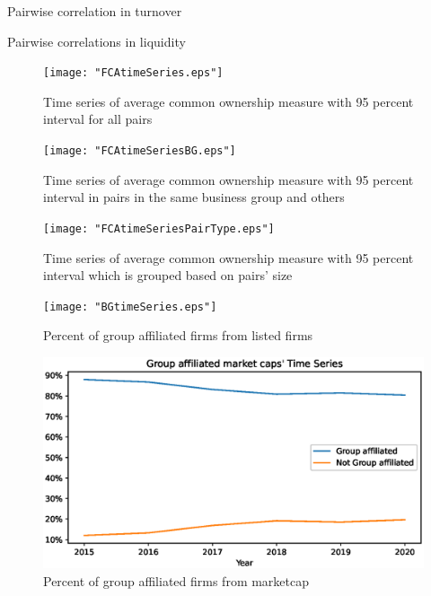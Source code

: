 \documentclass[12pt, a4paper]{article}
\begin{document}
\begin{table}[htbp]
	\centering
	\caption{Pairwise correlation in turnover  }
	\resizebox{0.7\textheight}{!}{
		\centering
		
	}
	\label{mresult2-turnover}
\end{table}

\begin{table}[htbp]
	\centering
	\caption{Pairwise correlations in liquidity}
	\resizebox{0.7\textheight}{!}{
		\centering
		
	}
	\label{mresult2-liquidity}
	\end{table}



\newpage
		\begin{figure}
	\centering  
	\caption{Time series of average common ownership measure with 95 percent interval for all pairs}
	\texttt{[image: "FCAtimeSeries.eps"]}
	
\end{figure} 

			\begin{figure}
	\centering  
	\caption{Time series of average common ownership measure with 95 percent interval in pairs in the same business group and others}
	\texttt{[image: "FCAtimeSeriesBG.eps"]}
\end{figure}    

\begin{figure}
	\centering  
	\caption{Time series of average common ownership measure with 95 percent interval which is grouped based on pairs' size}
	\texttt{[image: "FCAtimeSeriesPairType.eps"]}
\end{figure}




	\begin{figure}
	\centering  
	\caption{Percent of group affiliated firms from listed firms}
	\texttt{[image: "BGtimeSeries.eps"]}
	
\end{figure}  

\begin{figure}
	\centering  
	\caption{Percent of group affiliated firms from marketcap}
	\includegraphics[width=\linewidth]{"BGMarketCaptimeSeries.eps"}
	
\end{figure}
 
%
\end{document}
